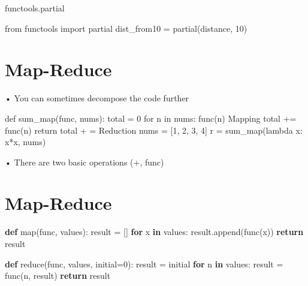 \documentclass[
  letterpaper,
  DIV=11,
  numbers=noendperiod]{scrreprt}
\newenvironment{Shaded}{\begin{snugshade}}{\end{snugshade}}
\newcommand{\BuiltInTok}[1]{\textcolor[rgb]{0.00,0.23,0.31}{#1}}
\newcommand{\ControlFlowTok}[1]{\textcolor[rgb]{0.00,0.23,0.31}{\textbf{#1}}}
\newcommand{\DecValTok}[1]{\textcolor[rgb]{0.68,0.00,0.00}{#1}}
\newcommand{\ImportTok}[1]{\textcolor[rgb]{0.00,0.46,0.62}{#1}}
\newcommand{\KeywordTok}[1]{\textcolor[rgb]{0.00,0.23,0.31}{\textbf{#1}}}
\newcommand{\NormalTok}[1]{\textcolor[rgb]{0.00,0.23,0.31}{#1}}
\newcommand{\OperatorTok}[1]{\textcolor[rgb]{0.37,0.37,0.37}{#1}}
\begin{document}
functools.partial

\begin{Shaded}
\begin{Highlighting}[]
\ImportTok{from}\NormalTok{ functools }\ImportTok{import}\NormalTok{ partial dist\_from10 }\OperatorTok{=}\NormalTok{ partial(distance, }\DecValTok{10}\NormalTok{) }
\end{Highlighting}
\end{Shaded}


\chapter{Map-Reduce}\label{map-reduce}

• You can sometimes decompose the code further

\begin{Shaded}
\begin{Highlighting}[]
\NormalTok{def sum\_map(func, nums): total = 0 for n in nums: func(n) Mapping total += func(n) return total + = Reduction  }
\NormalTok{nums = [1, 2, 3, 4] r = sum\_map(lambda x: x*x, nums) }
\end{Highlighting}
\end{Shaded}

• There are two basic operations (+, func)


\chapter{Map-Reduce}\label{map-reduce-1}

\begin{Shaded}
\begin{Highlighting}[]
\KeywordTok{def} \BuiltInTok{map}\NormalTok{(func, values): result }\OperatorTok{=}\NormalTok{ [] }\ControlFlowTok{for}\NormalTok{ x }\KeywordTok{in}\NormalTok{ values: result.append(func(x)) }\ControlFlowTok{return}\NormalTok{ result }
\end{Highlighting}
\end{Shaded}

\begin{Shaded}
\begin{Highlighting}[]
\KeywordTok{def} \BuiltInTok{reduce}\NormalTok{(func, values, initial}\OperatorTok{=}\DecValTok{0}\NormalTok{):}
\NormalTok{    result }\OperatorTok{=}\NormalTok{ initial}
    \ControlFlowTok{for}\NormalTok{ n }\KeywordTok{in}\NormalTok{ values:}
\NormalTok{        result }\OperatorTok{=}\NormalTok{ func(n, result)}
    \ControlFlowTok{return}\NormalTok{ result }
\end{Highlighting}
\end{Shaded}
\end{document}
